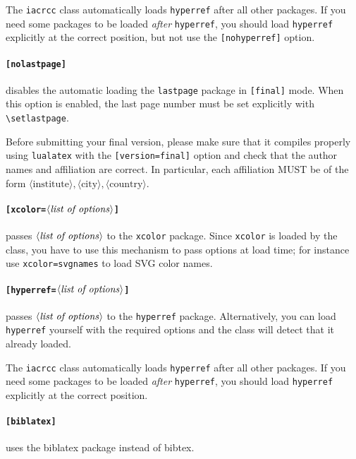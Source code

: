 \documentclass{iacrcc}
\begin{document}
The \texttt{iacrcc} class automatically loads \texttt{hyperref}
after all other packages.  If you need some packages to be loaded
\emph{after} \texttt{hyperref}, you should load \texttt{hyperref}
explicitly at the correct position, but not use the \texttt{[nohyperref]} option.

\paragraph{\texttt{[nolastpage]}}
disables the automatic loading the \texttt{lastpage} package in
\texttt{[final]} mode.  When this option is enabled, the last page
number must be set explicitly with
\texttt{\textbackslash{}setlastpage}.

Before submitting your final version, please make sure that it compiles
properly using \texttt{lualatex} with the \texttt{[version=final]} option
and check that the author names and affiliation are
correct.  In particular, each affiliation MUST be of the form
$\langle\text{institute}\rangle, \langle\text{city}\rangle,
\langle\text{country}\rangle$.

\paragraph{\texttt{[xcolor=$\langle\text{\emph{list of options}}\rangle$]}}
passes $\langle\text{\emph{list of options}}\rangle$ to the
\texttt{xcolor} package.  Since \texttt{xcolor} is loaded by the class,
you have to use this mechanism to pass options at load time; for instance
use \texttt{xcolor=svgnames} to load SVG color names.

\paragraph{\texttt{[hyperref=$\langle\text{\emph{list of options}}\rangle$]}}
passes $\langle\text{\emph{list of options}}\rangle$ to the
\texttt{hyperref} package.  Alternatively, you can load
\texttt{hyperref} yourself with the required options and the class will
detect that it already loaded.

The \texttt{iacrcc} class automatically loads \texttt{hyperref}
after all other packages.  If you need some packages to be loaded
\emph{after} \texttt{hyperref}, you should load \texttt{hyperref}
explicitly at the correct position.

\paragraph{\texttt{[biblatex]}} uses the biblatex package instead of bibtex.
\end{document}
